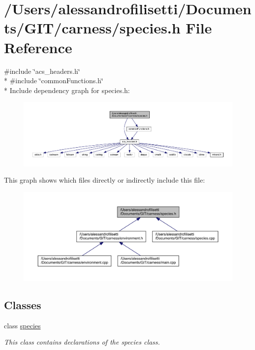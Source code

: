 \hypertarget{a00095}{\section{/\-Users/alessandrofilisetti/\-Documents/\-G\-I\-T/carness/species.h File Reference}
\label{a00095}
}
{\ttfamily \#include \char`\"{}acs\-\_\-headers.\-h\char`\"{}}\\*
{\ttfamily \#include \char`\"{}common\-Functions.\-h\char`\"{}}\\*
Include dependency graph for species.\-h\-:\nopagebreak
\begin{figure}[H]
\begin{center}
\leavevmode
\includegraphics[width=350pt]{a00145}
\end{center}
\end{figure}
This graph shows which files directly or indirectly include this file\-:\nopagebreak
\begin{figure}[H]
\begin{center}
\leavevmode
\includegraphics[width=350pt]{a00146}
\end{center}
\end{figure}
\subsection*{Classes}
\begin{DoxyCompactItemize}
\item 
class \hyperlink{a00022}{species}
\begin{DoxyCompactList}\small\item\em This class contains declarations of the species class. \end{DoxyCompactList}\end{DoxyCompactItemize}
